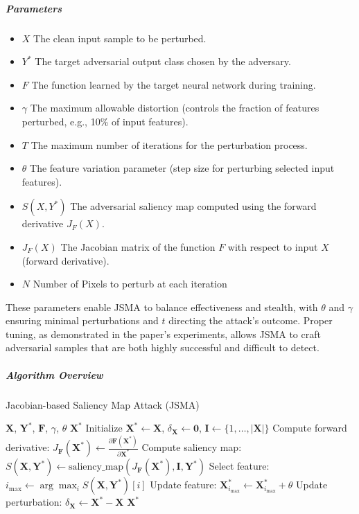 \documentclass[../main.tex]{subfiles}
\begin{document}
\subparagraph{Parameters}

\begin{itemize}
    \item $X$ The clean input sample to be perturbed.
    \item $Y^*$ The target adversarial output class chosen by the adversary.
    \item $F$ The function learned by the target neural network during training.
    \item $\gamma$ The maximum allowable distortion (controls the fraction of features perturbed, e.g., 10\% of input features).
    \item $T$ The maximum number of iterations for the perturbation process.
    \item $\theta$ The feature variation parameter (step size for perturbing selected input features).
    \item $S(X, Y^*)$ The adversarial saliency map computed using the forward derivative $J_F(X)$.
    \item $J_F(X)$ The Jacobian matrix of the function $F$ with respect to input $X$ (forward derivative).
    \item $N$ Number of Pixels to perturb at each iteration
\end{itemize}


These parameters enable JSMA to balance effectiveness and stealth, with $\theta$ and $\gamma$ ensuring minimal perturbations and $t$ directing the attack’s outcome. Proper tuning, as demonstrated in the paper’s experiments, allows JSMA to craft adversarial samples that are both highly successful and difficult to detect.


\subparagraph{Algorithm Overview}
\begin{breakablealgorithm}{Jacobian-based Saliency Map Attack (JSMA)}
\begin{algorithmic}[1]
\Require $\mathbf{X}$, $\mathbf{Y}^*$, $\mathbf{F}$, $\gamma$, $\theta$
\Ensure $\mathbf{X}^*$
\State Initialize $\mathbf{X}^* \gets \mathbf{X}$, $\delta_{\mathbf{X}} \gets \mathbf{0}$, $\mathbf{I} \gets \{1, \ldots, |\mathbf{X}|\}$
    \State Compute forward derivative: $J_{\mathbf{F}}(\mathbf{X}^*) \gets \frac{\partial \mathbf{F}(\mathbf{X}^*)}{\partial \mathbf{X}^*}$
    \State Compute saliency map: $S(\mathbf{X}, \mathbf{Y}^*) \gets \text{saliency\_map}(J_{\mathbf{F}}(\mathbf{X}^*), \mathbf{I}, \mathbf{Y}^*)$
    \State Select feature: $i_{\max} \gets \arg \max_i S(\mathbf{X}, \mathbf{Y}^*)[i]$
    \State Update feature: $\mathbf{X}^*_{i_{\max}} \gets \mathbf{X}^*_{i_{\max}} + \theta$
    \State Update perturbation: $\delta_{\mathbf{X}} \gets \mathbf{X}^* - \mathbf{X}$
\EndWhile
\State \Return $\mathbf{X}^*$
\end{algorithmic}

\end{breakablealgorithm}
\end{document}
